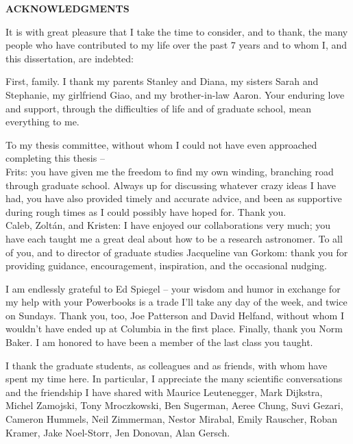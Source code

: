 \newpage

\begin{center}

{\large \bf ACKNOWLEDGMENTS }

\end{center}

\vspace{1.0cm}


It is with great pleasure that I take the time to consider, and to
thank, the many people who have contributed to my life over the past 7
years and to whom I, and this dissertation, are indebted:

First, family.  I thank my parents Stanley and Diana, my sisters Sarah
and Stephanie, my girlfriend Giao, and my brother-in-law Aaron.  Your
enduring love and support, through the difficulties of life and of
graduate school, mean everything to me.

To my thesis committee, without whom I could not have even approached
completing this thesis --\\
%
Frits: you have given me the freedom to find my own winding, branching
road through graduate school.  Always up for discussing whatever crazy
ideas I have had, you have also provided timely and accurate advice,
and been as supportive during rough times as I could possibly have
hoped for.  Thank you.\\
%
Caleb, Zolt\'an, and Kristen: I have enjoyed our collaborations very
much; you have each taught me a great deal about how to be a research
astronomer.
%
To all of you, and to director of graduate studies Jacqueline van
Gorkom: thank you for providing guidance, encouragement, inspiration,
and the occasional nudging.

I am endlessly grateful to Ed Spiegel -- your wisdom and humor in
exchange for my help with your Powerbooks is a trade I'll take any day
of the week, and twice on Sundays.  Thank you, too, Joe Patterson and
David Helfand, without whom I wouldn't have ended up at Columbia in
the first place.  Finally, thank you Norm Baker.  I am honored to have
been a member of the last class you taught.

I thank the graduate students, as colleagues and as friends, with whom
have spent my time here.  In particular, I appreciate the many
scientific conversations and the friendship I have shared with Maurice
Leutenegger, Mark Dijkstra, Michel Zamojski, Tony Mroczkowski, Ben
Sugerman, Aeree Chung, Suvi Gezari, Cameron Hummels, Neil Zimmerman,
Nestor Mirabal, Emily Rauscher, Roban Kramer, Jake Noel-Storr, Jen
Donovan, Alan Gersch.


